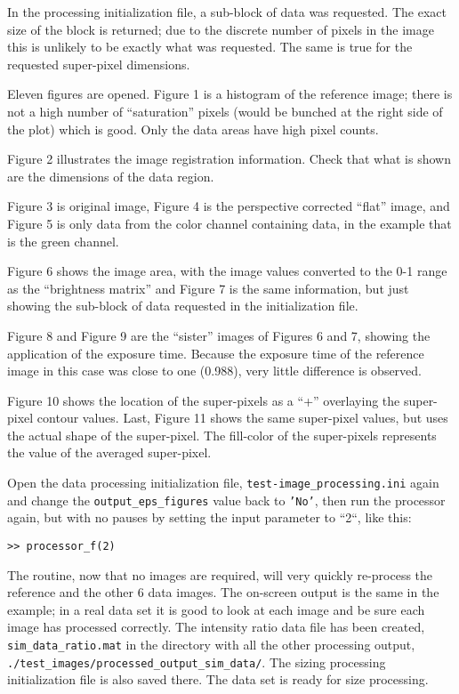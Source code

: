 In the processing initialization file, a sub-block of data was requested.  The exact size of the block is returned; due to the discrete number of pixels in the image this is unlikely to be exactly what was requested.  The same is true for the requested super-pixel dimensions.  

Eleven figures are opened.  Figure 1 is a histogram of the reference image; there is not a high number of ``saturation'' pixels (would be bunched at the right side of the plot) which is good.  Only the data areas have high pixel counts.

Figure 2 illustrates the image registration information.  Check that what is shown are the dimensions of the data region.

Figure 3 is original image, Figure 4 is the perspective corrected ``flat'' image, and Figure 5 is only data from the color channel containing data, in the example that is the green channel.

Figure 6 shows the image area, with the image values converted to the 0-1 range as the ``brightness matrix'' and Figure 7 is the same information, but just showing the sub-block of data requested in the initialization file.

Figure 8 and Figure 9 are the ``sister'' images of Figures 6 and 7, showing the application of the exposure time.  Because the exposure time of the reference image in this case was close to one (0.988), very little difference is observed.  

Figure 10 shows the location of the super-pixels as a ``+'' overlaying the super-pixel contour values.  Last, Figure 11 shows the same super-pixel values, but uses the actual shape of the super-pixel.  The fill-color of the super-pixels represents the value of the averaged super-pixel.

Open the data processing initialization file, \texttt{test-image\_processing.ini} again and change the \texttt{output\_eps\_figures} value back to \texttt{'No'}, then run the processor again, but with no pauses by setting the input parameter to ``2``, like this:

\begin{verbatim}
>> processor_f(2)
\end{verbatim}

The routine, now that no images are required, will very quickly re-process the reference and the other 6 data images. The on-screen output is the same in the example; in a real data set it is good to look at each image and be sure each image has processed correctly.  The intensity ratio data file has been created, \texttt{sim\_data\_ratio.mat} in the directory with all the other processing output, \texttt{./test\_images/processed\_output\_sim\_data/}.  The sizing processing initialization file is also saved there.  The data set is ready for size processing.

